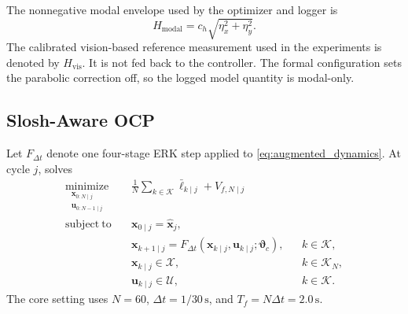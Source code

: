 The nonnegative modal envelope used by the optimizer and logger is
\begin{equation}
  H_{\mathrm{modal}}
  =c_h\sqrt{\eta_x^2+\eta_y^2}.
  \label{eq:modal_height}
\end{equation}
The calibrated vision-based reference measurement used in the experiments is denoted by $H_{\mathrm{vis}}$. It is not fed back to the controller. The formal configuration sets the parabolic correction off, so the logged model quantity is modal-only.

\subsection{Slosh-Aware \MPCC{} OCP}

Let \(F_{\Delta t}\) denote one four-stage ERK step applied to
\cref{eq:augmented_dynamics}. At cycle \(j\), \SMPCC{} solves
\begin{equation}
\begin{aligned}
  \underset{\substack{\bm x_{0:N\mid j}\\
                      \bm u_{0:N-1\mid j}}}{\operatorname{minimize}}
  \quad&
  \frac{1}{N}\sum_{k\in\mathcal K}
  \bar\ell_{k\mid j}
  +V_{f,N\mid j}\\
  \mathrm{subject\ to}\quad
  &\bm x_{0\mid j}=\hat{\bm x}_j,\\
  &\bm x_{k+1\mid j}
  =F_{\Delta t}(\bm x_{k\mid j},\bm u_{k\mid j};
  \bm\vartheta_c),
  &&k\in\mathcal K,\\
  &\bm x_{k\mid j}\in\mathcal X,
  &&k\in\mathcal K_N,\\
  &\bm u_{k\mid j}\in\mathcal U,
  &&k\in\mathcal K.
\end{aligned}
\label{eq:core_ocp}
\end{equation}
The core setting uses \(N=60\), \(\Delta t=1/30\,\mathrm{s}\), and
\(T_f=N\Delta t=2.0\,\mathrm{s}\).

